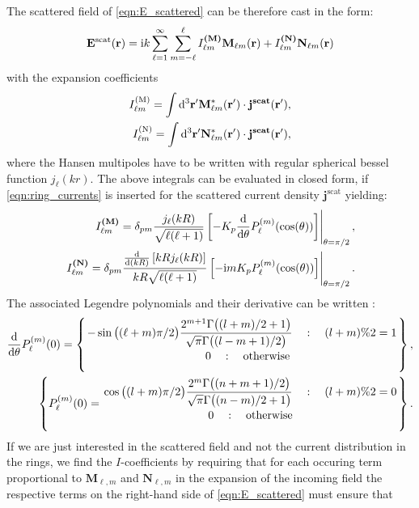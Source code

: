 The scattered field of \cref{eqn:E_scattered} can be therefore cast in the form:
\begin{equation}
\mathbf{E}^\text{scat}(\mathbf{r}) = \mathrm{i} k \sum_{\ell=1}^\infty  \sum_{m=-\ell}^\ell
I_{\ell m}^\textbf{(M)}\mathbf{M}_{\ell m}(\mathbf{r})+
I_{\ell m}^\textbf{(N)}\mathbf{N}_{\ell m}(\mathbf{r})
\label{eqn:Escat}
\end{equation}
with the expansion coefficients
\begin{align}
I_{\ell m}^\text{(M)} = \int \mathrm{d}^3\mathbf{r}' \mathbf{M}^*_{\ell m}(\mathbf{r}')\cdot
\mathbf{j}^\textbf{scat}(\mathbf{r}'),\\
I_{\ell m}^\text{(N)} = \int \mathrm{d}^3\mathbf{r}' \mathbf{N}^*_{\ell m}(\mathbf{r}')\cdot
\mathbf{j}^\textbf{scat}(\mathbf{r}'),
\end{align}
where the Hansen multipoles have to be written with regular spherical bessel function $j_\ell(kr)$. The above integrals can be evaluated in closed form, if \cref{eqn:ring_currents} is inserted for the scattered current density $\mathbf{j}^\text{scat}$ yielding:
\begin{align}
\left.I_{\ell m}^\textbf{(M)} = \delta_{p m}\frac{j_\ell(kR)}{\sqrt{\ell(\ell+1)}} \left[-K_p\frac{\displaystyle\mathrm{d}}{\mathrm{d} \theta}P_{\ell}^{(m)}(\cos(\theta))
\right]\right \vert_{\theta=\pi/2},\\
\left.I_{\ell m}^\textbf{(N)} =  \delta_{p m} 
\frac{\frac{\mathrm{d}}{\mathrm{d} (kR)}\left[kR j_\ell(kR)\right]}{kR\sqrt{\ell(\ell+1)}}\left[-\mathrm{i} m K_p
P_\ell^{(m)}(\cos(\theta)) \right]\right\vert_{\theta=\pi/2}.
\end{align}
The associated Legendre polynomials and their derivative can be written \Cite{Leong1997}:
\begin{align}
\frac{\rd}{\rd \theta}P_\ell^{(m)}(0) =\left\{\ontop{}{}{
-\sin\big((\ell+m)\pi/2\big)\dfrac{2^{m+1}\Gamma\big((l+m)/2+1\big)}{\sqrt{\pi}\Gamma\big((l-m+1)/2\big) }
\quad : \quad (l+m)\%2=1}{\quad0\quad: \quad\text{otherwise}}\right\},
\label{eqn:Plm0diff}
\\\left\{
P_\ell^{(m)}(0) = \ontop{}{}{\cos\big((l+m)\pi/2\big)\dfrac{2^m \Gamma\big((n+m+1)/2\big)}{\sqrt{\pi}\Gamma\big((n-m)/2+1\big)}\quad:\quad (l+m)\%2=0}{0\quad:\quad \text{otherwise}}\right\}.
\label{eqn:Plm0}
\end{align}
If we are just interested in the scattered field and not the current distribution in the rings, we find the $I$-coefficients by requiring that for each occuring term proportional to $\mathbf{M}_{\ell,m}$ and $\mathbf{N}_{\ell,m}$ in the expansion of the incoming field the respective terms on the right-hand side of \cref{eqn:E_scattered} must ensure that 
